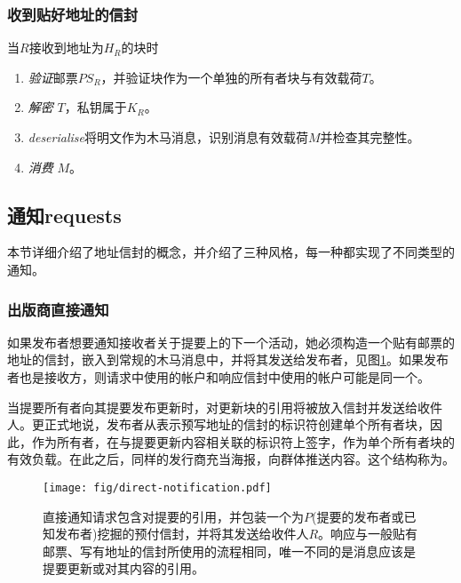 \subsubsection{收到贴好地址的信封}

当$R$接收到地址为$H_R$的块时

\begin{enumerate}
\item \emph{验证}邮票$PS_R$，并验证块作为一个单独的所有者块与有效载荷$T$。
\item \emph{解密} $T$，私钥属于$K_R$。
\item \emph{deserialise}将明文作为木马消息，识别消息有效载荷$M$并检查其完整性。
\item \emph{消费} $M$。
\end{enumerate}

\subsection{通知requests\statusgreen}\label{sec:notification-requests} 


本节详细介绍了地址信封的概念，并介绍了三种风格，每一种都实现了不同类型的通知。

\subsubsection{出版商直接通知}

如果发布者想要通知接收者关于提要上的下一个活动，她必须构造一个贴有邮票的地址的信封，嵌入到常规的木马消息中，并将其发送给发布者，见图\ref{fig:direct-notification}。如果发布者也是接收方，则请求中使用的帐户和响应信封中使用的帐户可能是同一个。


当提要所有者向其提要发布更新时，对更新块的引用将被放入信封并发送给收件人。更正式地说，发布者从表示预写地址的信封的标识符创建单个所有者块，因此，作为所有者，在与提要更新内容相关联的标识符上签字，作为单个所有者块的有效负载。在此之后，同样的发行商充当海报，向群体推送内容。这个结构称为。 

\begin{figure}[htbp]
   \centering
   \texttt{[image: fig/direct-notification.pdf]}
   \caption[直接通知请求和响应\statusgreen]{直接通知请求包含对提要的引用，并包装一个为$P$(提要的发布者或已知发布者)挖掘的预付信封，并将其发送给收件人$R$。响应与一般贴有邮票、写有地址的信封所使用的流程相同，唯一不同的是消息应该是提要更新或对其内容的引用。}
   \label{fig:direct-notification}
\end{figure}

